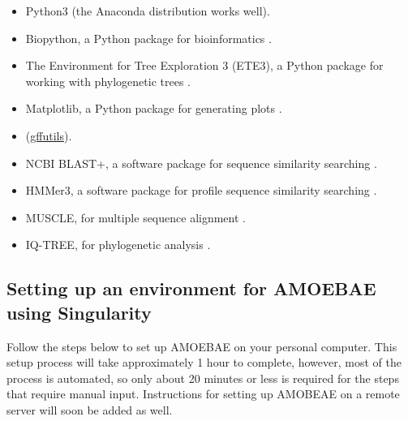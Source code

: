 \documentclass[12pt,letterpaper]{article}
\begin{document}
\begin{linenumbers}
\begin{itemize}

\item Python3 (the Anaconda distribution works well).

\item Biopython, a Python package for bioinformatics \citep{cock2009}.

\item The Environment for Tree Exploration 3 (ETE3), a Python package for
    working with phylogenetic trees \citep{huerta-cepas2016}.

\item Matplotlib, a Python package for generating plots \citep{hunter2007}.

\item (\href{https://pythonhosted.org/gffutils/}{gffutils}).

\item NCBI BLAST+, a software package for sequence similarity searching \citep{camacho2009}.

\item HMMer3, a software package for profile sequence similarity searching \citep{eddy1998}.

\item MUSCLE, for multiple sequence alignment \citep{edgar2004}.

\item IQ-TREE, for phylogenetic analysis \citep{nguyen2015}.


\end{itemize}


\subsection{Setting up an environment for AMOEBAE using Singularity}
\label{setup_section}


Follow the steps below to set up AMOEBAE on your personal computer. This setup
process will take approximately 1 hour to complete, however, most of the
process is automated, so only about 20 minutes or less is required for the
steps that require manual input.  Instructions for setting up AMOBEAE on a
remote server will soon be added as well.

\begin{enumerate}


\end{enumerate}
\end{linenumbers}
\end{document}
